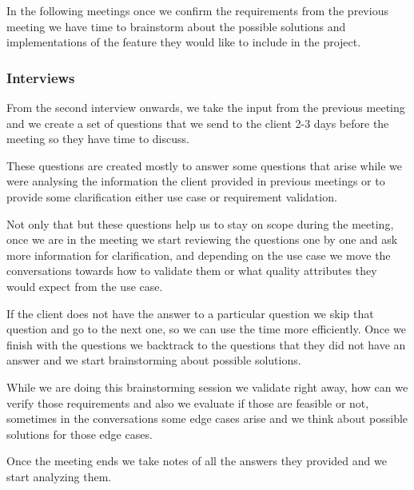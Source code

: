 \noindent In the following meetings once we confirm the requirements from the 
previous meeting we have time to brainstorm about the possible solutions and 
implementations of the feature they would like to include in the project.

\subsubsection{Interviews}
\begin{flushleft}
From the second interview onwards, we take the input from the previous meeting 
and we create a set of questions that we send to the client 2-3 days before 
the meeting so they have time to discuss. \linebreak

\noindent These questions are created mostly to answer some questions that 
arise while we were analysing the information the client provided in previous 
meetings or to provide some clarification either use case or 
requirement validation.  \linebreak

\noindent Not only that but these questions help us to stay on scope during 
the meeting, once we are in the meeting we start reviewing the questions one 
by one and ask more information for clarification, and depending on the use 
case we move the conversations towards how to validate them or what quality 
attributes they would expect from the use case. \linebreak

\noindent If the client does not have the answer to a particular question we 
skip that question and go to the next one, so we can use the time more 
efficiently. Once we finish with the questions we backtrack to the questions 
that they did not have an answer and we start brainstorming about 
possible solutions.  \linebreak

\noindent While we are doing this brainstorming session we validate right 
away, how can we verify those requirements and also we evaluate if those are 
feasible or not, sometimes in the conversations some edge cases arise and we 
think about possible solutions for those edge cases. \linebreak

\noindent Once the meeting ends we take notes of all the answers they provided 
and we start analyzing them.
\end{flushleft}